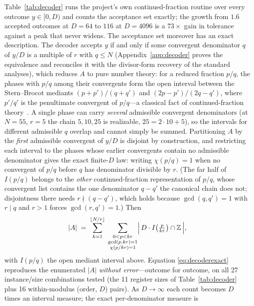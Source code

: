 \documentclass[aps,pra,reprint,superscriptaddress,nofootinbib,floatfix]{revtex4-2}
\begin{document}
Table~\ref{tab:decoder} runs the project's own continued-fraction
routine over every outcome $y\in[0,D)$ and counts the acceptance set
exactly; the growth from $1.6$ accepted outcomes at $D=64$ to $116$ at
$D=4096$ is a $73\times$ gain in tolerance against a peak that never
widens. The acceptance set moreover has an exact description. The
decoder accepts $y$ if and only if some convergent denominator $q$ of
$y/D$ is a multiple of $r$ with $q\le N$ (Appendix~\ref{app:decoder}
proves the equivalence and reconciles it with the divisor-form
recovery of the standard analyses), which reduces $A$ to pure
number theory: for a reduced fraction $p/q$, the phases with $p/q$
among their convergents form the open interval between the
Stern--Brocot mediants $(p+p')/(q+q')$ and $(2p-p')/(2q-q')$, where
$p'/q'$ is the penultimate convergent of $p/q$---a classical fact of
continued-fraction theory~\cite{khinchin1964,hardy2008}. A single phase can carry \emph{several} admissible convergent
denominators (at $N{=}55$, $r{=}5$ the chain $5,10,25$ is realizable,
$25=2\cdot10+5$), so the intervals for different admissible $q$
overlap and cannot simply be summed. Partitioning $A$ by the
\emph{first} admissible convergent of $y/D$ is disjoint by
construction, and restricting each interval to the phases whose
earlier convergents contain no admissible denominator gives the exact
finite-$D$ law: writing $\chi(p/q)=1$ when no convergent of $p/q$
before $q$ has denominator divisible by $r$. (The far half of
$I(p/q)$ belongs to the \emph{other} continued-fraction
representation of $p/q$, whose convergent list contains the one
denominator $q-q'$ the canonical chain does not; disjointness there
needs $r\nmid(q-q')$, which holds because $\gcd(q,q')=1$ with
$r\mid q$ and $r>1$ forces $\gcd(r,q')=1$.) Then
\begin{equation}
\lvert A\rvert \;=\;
\sum_{k=1}^{\lfloor N/r\rfloor}\;
\sum_{\substack{0<p<kr\\ \gcd(p,kr)=1\\ \chi(p/kr)=1}}
\Bigl\lvert\, D\cdot I\!\left(\tfrac{p}{kr}\right)\cap\mathbb{Z}
\,\Bigr\rvert,
\label{eq:decoderexact}
\end{equation}
with $I(p/q)$ the open mediant interval above. Equation
\eqref{eq:decoderexact} reproduces the enumerated $\lvert A\rvert$
\emph{without error}---outcome for outcome, on all 27 instance/size
combinations tested (the 11 register sizes of
Table~\ref{tab:decoder} plus 16 within-modulus (order, $D$) pairs).
As
$D\to\infty$ each count becomes $D$ times an interval measure; the
exact per-denominator measure is
\end{document}
